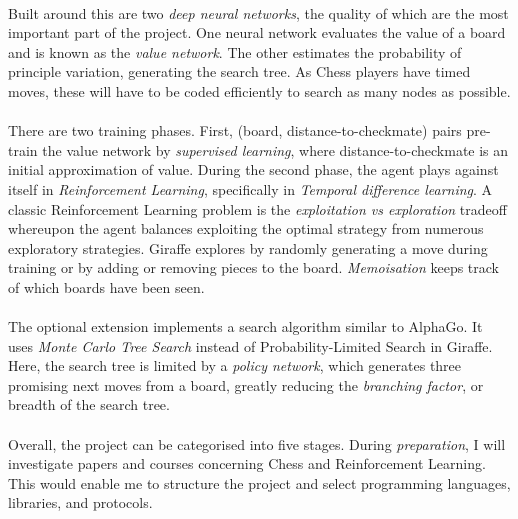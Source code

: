 \documentclass[12pt,a4paper]{book}
\begin{document}
\paragraph{}Built around this are two \textit{deep neural networks}, the quality of which are the most important part of the project. One neural network evaluates the value of a board and is known as the \textit{value network}. The other estimates the probability of principle variation, generating the search tree. As Chess players have timed moves, these will have to be coded efficiently to search as many nodes as possible.

\paragraph{} There are two training phases. First, (board, distance-to-checkmate) pairs pre-train the value network by \textit{supervised learning}, where distance-to-checkmate is an initial approximation of value. During the second phase, the agent plays against itself in \textit{Reinforcement Learning}, specifically in \textit{Temporal difference learning}. A classic Reinforcement Learning problem is the \textit{exploitation vs exploration} tradeoff whereupon the agent balances exploiting the optimal strategy from numerous exploratory strategies. Giraffe explores by randomly generating a move during training or by adding or removing pieces to the board. \textit{Memoisation} keeps track of which boards have been seen. \cite{giraffe}

\paragraph{}The optional extension implements a search algorithm similar to AlphaGo. It uses \textit{Monte Carlo Tree Search} instead of Probability-Limited Search in Giraffe. Here, the search tree is limited by a \textit{policy network}, which generates three promising next moves from a board, greatly reducing the \textit{branching factor}, or breadth of the search tree. \cite{AlphaGo}

\paragraph{}Overall, the project can be categorised into five stages. During \textit{preparation}, I will investigate papers and courses concerning Chess and Reinforcement Learning. \cite{giraffe} \cite{AlphaGo} \cite{TD-Gammon} \cite{knightcap} This would enable me to structure the project and select programming languages, libraries, and protocols.
\end{document}

